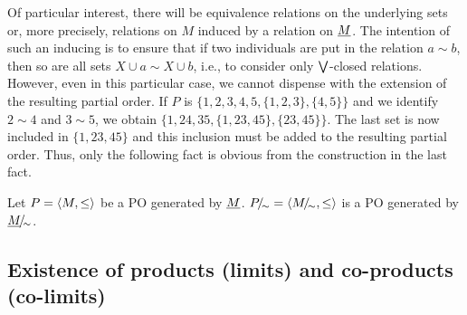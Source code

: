 Of particular interest, there will be equivalence relations on the
underlying sets or, more precisely, relations on $M$ induced by a
relation on $\underline {M}$.  The intention of such an inducing is to
ensure that if two individuals are put in the relation $a\sim b$, then
so are all sets $X\cup{a}\sim X\cup{b}$, i.e., to consider only
$\bigvee$-closed relations. However, even in this particular case, we
cannot dispense with the extension of the resulting partial order.
If $P$ is
$\{1,2,3,4,5,\{1,2,3\},\{4,5\}\}$ and we identify $2\sim 4$ and $3\sim
5$, we obtain $\{1,24,35,\{1,23,45\},\{23,45\}\}$. The last set is now
included in $\{1,23,45\}$ and this inclusion must be added to the
resulting partial order.
Thus, only the following fact is obvious from the construction in the last fact.

\begin{Fact}
Let $P=\langle M,\leq\rangle$ be a PO generated by $\underline {M}$. 
$P\!{\textstyle /}\!_\sim =\langle M\!{\textstyle /}\!_\sim,\leq\rangle$ is a PO generated by $\underline {M}\!{\textstyle /}\!_\sim$.
\end{Fact}


%

\subsection{Existence of products (limits) and co-products (co-limits)}



